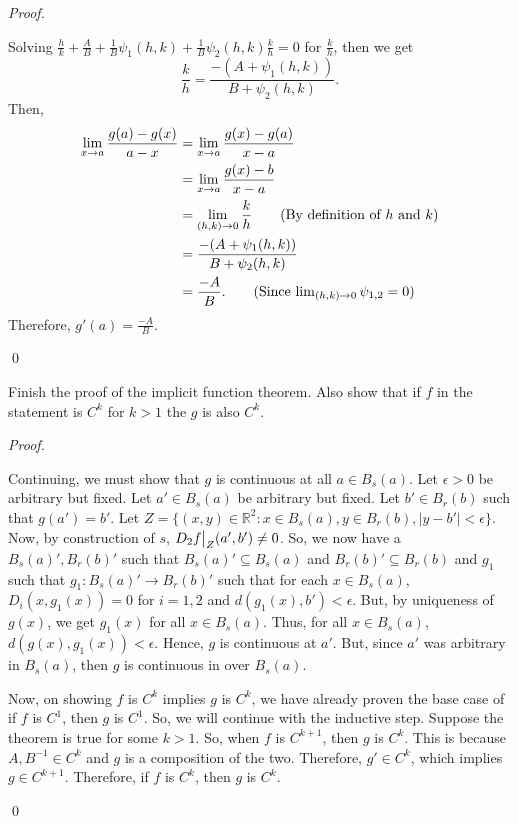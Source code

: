 \documentclass[12pt]{article}
\newenvironment{problem}[2][Problem]{\begin{trivlist}
\item[\hskip \labelsep {\bfseries #1}\hskip \labelsep {\bfseries #2.}]}{\end{trivlist}}
\newenvironment{sol}
    {\emph{Proof.}
    }
    {
    \qed
    }
\newcommand\restr[2]{{%
  \left.\kern-\nulldelimiterspace %
  #1 %
  \vphantom{\big|} %
  \right|_{#2} %
  }}
\begin{document}
\begin{problem}{21}
\begin{itemize}
    \begin{sol}
    Solving $\frac{h}{k} + \frac{A}{B} + \frac{1}{B}\psi_1(h,k) + \frac{1}{B}\psi_2(h,k)\frac{k}{h} = 0$ for $\frac{k}{h}$, then we get $$\frac{k}{h} = \frac{-(A + \psi_1(h,k))}{B + \psi_2(h,k)}.$$ Then, \begin{align*}
        \lim_{x \to a}\frac{g(a) - g(x)}{a-x} &= \lim_{x \to a}\frac{g(x) - g(a)}{x-a} \\ &= \lim_{x \to a}\frac{g(x) - b}{x-a} \\ &= \lim_{(h,k) \to 0} \frac{k}{h} \tag*{(By definition of $h$ and $k$)}\\ &= \frac{-(A + \psi_1(h,k))}{B + \psi_2(h,k)} \\ &= \frac{-A}{B}. \tag*{(Since $\lim_{(h,k) \to 0} \psi_{1,2} = 0$)}
    \end{align*}
    Therefore, $g'(a) = \frac{-A}{B}$.
    \end{sol}
\end{itemize}
\end{problem}


\begin{problem}{22}
Finish the proof of the implicit function theorem. Also show that if $f$ in the statement is $C^k$ for $k > 1$ the $g$ is also $C^k$.
\end{problem}

\begin{sol}
Continuing, we must show that $g$ is continuous at all $a \in B_s(a)$. Let $\epsilon > 0$ be arbitrary but fixed. Let $a' \in B_s(a)$ be arbitrary but fixed. Let $b' \in B_r(b)$ such that $g(a') = b'$. Let $Z = \{(x,y) \in \mathbb{R}^2 : x \in B_s(a),y \in B_r(b),\left|y - b'\right| < \epsilon\}$. Now, by construction of $s$, $D_2\restr{f}{Z}(a',b') \neq 0$. So, we now have a $B_s(a)',B_r(b)'$ such that $B_s(a)' \subseteq B_s(a)$ and $B_r(b)' \subseteq B_r(b)$ and $g_1$ such that $g_1 : B_s(a)' \to B_r(b)'$ such that for each $x \in B_s(a)$, $D_i(x,g_1(x)) = 0$ for $i = 1,2$ and $d(g_1(x),b') < \epsilon$. But, by uniqueness of $g(x)$, we get $g_1(x)$ for all $x \in B_s(a)$. Thus, for all $x \in B_s(a)$, $d(g(x),g_1(x)) < \epsilon$. Hence, $g$ is continuous at $a'$. But, since $a'$ was arbitrary in $B_s(a)$, then $g$ is continuous in over $B_s(a)$.  

Now, on showing $f$ is $C^k$ implies $g$ is $C^k$, we have already proven the base case of if $f$ is $C^1$, then $g$ is $C^1$. So, we will continue with the inductive step. Suppose the theorem is true for some $k > 1$. So, when $f$ is $C^{k+1}$, then $g$ is $C^k$. This is because $A,B^{-1} \in C^k$ and $g$ is a composition of the two. Therefore, $g' \in C^k$, which implies $g \in C^{k+1}$. Therefore, if $f$ is $C^k$, then $g$ is $C^k$.  
\end{sol}
\end{document}

